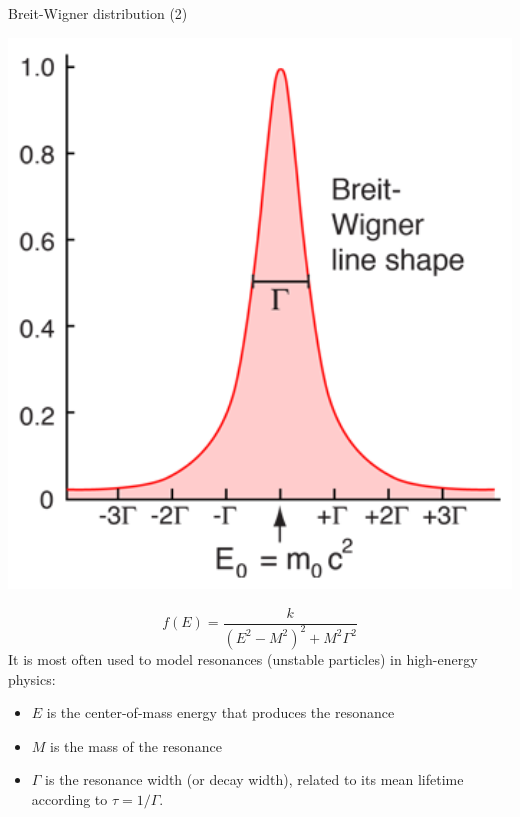 \documentclass[10pt]{beamer} %
\begin{document}
\begin{frame}{Breit-Wigner distribution (2)}
    \begin{minipage}[b]{0.49\linewidth}
        \centering
        \includegraphics[width=1.0\textwidth]{Figs/BreitWigner.png}
    \end{minipage}
        \hfill
    \begin{minipage}[b]{0.49\linewidth}
        \begin{equation}
        f(E) = \frac{k}{\left(E^2-M^2\right)^2+M^2\Gamma^2}
        \end{equation}
        It is most often used to model resonances (unstable particles) in high-energy physics:
        \begin{itemize}
            \item $E$ is the center-of-mass energy that produces the resonance
            \item $M$ is the mass of the resonance
            \item $\Gamma$ is the resonance width (or decay width), related to its mean lifetime according to $\tau = 1/\Gamma$. 
        \end{itemize}
    \end{minipage}
\end{frame}
\end{document}
